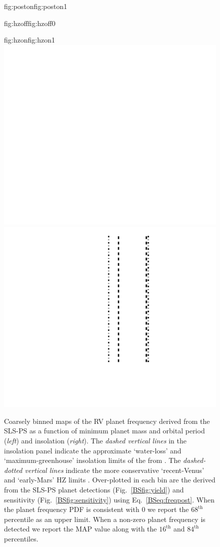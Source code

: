 \begin{figure}
\begin{ocg}{fig:poston}{fig:poston}{1}
  \end{ocg}
  \hspace{-\hsize}%
  \begin{ocg}{fig:hzoff}{fig:hzoff}{0}%
  \end{ocg}%
  \begin{ocg}{fig:hzon}{fig:hzon}{1}%
    \includegraphics[width=0.5\hsize]{figures/occurrencePMpsini_HZ.png}%
    \includegraphics[width=0.5\hsize]{figures/occurrenceFMpsini_HZ.png}%
  \end{ocg}
  \hspace{-\hsize}%
  \caption[Planet occurrence rate maps derived from the resuls of the SLS-PS.]
      {\small Coarsely binned maps of the RV planet frequency derived from the  
    SLS-PS as a function of minimum planet mass and orbital period 
    (\emph{left}) and insolation (\emph{right}). The \emph{dashed vertical lines} in the
    insolation panel indicate the approximate `water-loss' and `maximum-greenhouse' insolation limits
    of the  from \cite{kopparapu13}.
    The \emph{dashed-dotted vertical lines}
    indicate the more conservative `recent-Venus' and `early-Mars' HZ limits \citep{kopparapu13}. 
    Over-plotted in each bin are the   
     derived from
    the SLS-PS planet detections (Fig.~\ref{BSfig:yield}) and sensitivity (Fig.~\ref{BSfig:sensitivity}) using
    Eq.~\ref{BSeq:freqpost}. When the planet frequency PDF is consistent with 0 we
    report the $68^{\text{th}}$ percentile as an upper limit. When a non-zero planet frequency is detected
    we report the MAP value along with the $16^{\text{th}}$ and $84^{\text{th}}$ percentiles.}
  \label{BSfig:occurrencegrid}
\end{figure}

